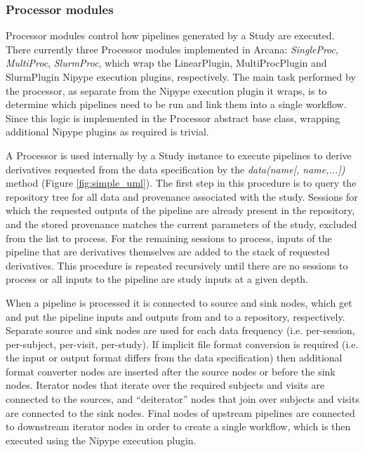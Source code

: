 \documentclass[smallextended]{svjour3}       %
\begin{document}
\subsubsection*{Processor modules}
\label{processor-modules}

Processor modules control how pipelines generated by a Study
are executed. There currently three Processor modules implemented in
Arcana: \emph{SingleProc}, \emph{MultiProc},
\emph{SlurmProc}, which wrap the LinearPlugin, MultiProcPlugin and SlurmPlugin
Nipype execution plugins, respectively. The main task performed
by the processor, as separate from the Nipype execution plugin it wraps,
is to determine which pipelines need to be run and link them into a
single workflow. Since this logic is implemented in the Processor
abstract base class, wrapping additional Nipype plugins as required is
trivial.

A Processor is used internally by a Study instance to execute pipelines
to derive derivatives requested from the data specification by the
\emph{data(name{[}, name,...{]})} method (Figure \ref{fig:simple_uml}). The first
step in this procedure is to query the repository tree for all data and
provenance associated with the study. Sessions for which the requested
outputs of the pipeline are already present in the repository, and the stored
provenance matches the current parameters of the study,
excluded from the list to process. For the remaining sessions to
process, inputs of the pipeline that are derivatives themselves are
added to the stack of requested derivatives. This procedure is repeated
recursively until there are no sessions to process or all inputs to the
pipeline are study inputs at a given depth.

When a pipeline is processed it is connected to source and
sink nodes, which get and put the pipeline inputs and outputs
from and to a repository, respectively. Separate source and sink nodes
are used for each data frequency (i.e. per-session, per-subject,
per-visit, per-study). If implicit file format conversion is required
(i.e. the input or output format differs from the data specification)
then additional format converter nodes are inserted after the source
nodes or before the sink nodes. Iterator nodes that iterate over the
required subjects and visits are connected to the sources, and ``deiterator''
nodes that join over subjects and visits are connected to the sink
nodes. Final nodes of upstream pipelines are connected to downstream
iterator nodes in order to create a single workflow, which is then executed using
the Nipype execution plugin.
\end{document}

